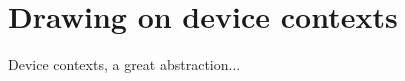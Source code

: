 \chapter{Drawing on device contexts}\label{chapdrawing}
%
%
\setfooter{\thepage}{}{}{}{}{\thepage}%

Device contexts, a great abstraction...

